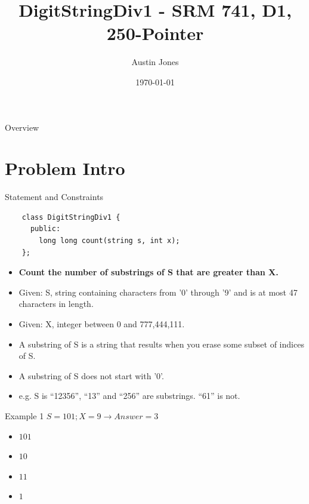 \documentclass[10pt]{beamer}
\title{DigitStringDiv1 \-- SRM 741, D1, 250-Pointer}
\author{Austin Jones}
\institute{University of Tennessee \-- Knoxville}
\date{\today}
\begin{document}
\maketitle

\begin{frame}{Overview}
  \Large
  \tableofcontents
\end{frame}

\section{Problem Intro}

\begin{frame}[fragile]{Statement and Constraints}
  \begin{verbatim}
    class DigitStringDiv1 {
      public:
        long long count(string s, int x);
    };
  \end{verbatim}
  \begin{itemize}
    \item \textbf{Count the number of substrings of S that are greater than X.}
    \item Given: S, string containing characters from '0' through '9' and is at most 47 characters in length.
    \item Given: X, integer between 0 and 777,444,111.
    \item A substring of S is a string that results when you erase some subset of indices of S.
    \item A substring of S does not start with '0'.
    \item e.g. S is ``12356'', ``13'' and ``256'' are substrings. ``61'' is not.
  \end{itemize}
\end{frame}

\begin{frame}{Example 1}
  \Large
  $S = 101; X = 9 \rightarrow Answer = 3$ \\
  \begin{itemize}[<+->]
    \item $101$ \only<5->{$ > 9$}   \only<6>{Here!}
    \item $10$     
    \item $11$     
    \item $1$   
  \end{itemize}
\end{frame}
\end{document}
